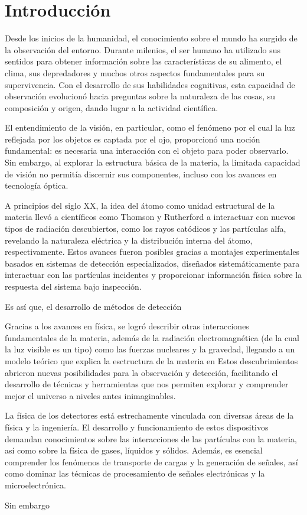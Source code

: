 \documentclass[]{book}
\begin{document}
\chapter{Introducción}

Desde los inicios de la humanidad, el conocimiento sobre el mundo ha surgido de la observación del entorno. Durante milenios, el ser humano ha utilizado sus sentidos para obtener información sobre las características de su alimento, el clima, sus depredadores y muchos otros aspectos fundamentales para su supervivencia. Con el desarrollo de sus habilidades cognitivas, esta capacidad de observación evolucionó hacia preguntas sobre la naturaleza de las cosas, su composición y origen, dando lugar a la actividad científica.

\noindent El entendimiento de la visión, en particular, como el fenómeno por el cual la luz reflejada por los objetos es captada por el ojo, proporcionó una noción fundamental: es necesaria una interacción con el objeto para poder observarlo. Sin embargo, al explorar la estructura básica de la materia, la limitada capacidad de visión no permitía discernir sus componentes, incluso con los avances en tecnología óptica.

A principios del siglo XX, la idea del átomo como unidad estructural de la materia llevó a científicos como Thomson y Rutherford a interactuar con nuevos tipos de radiación descubiertos, como los rayos catódicos y las partículas alfa, revelando la naturaleza eléctrica y la distribución interna del átomo, respectivamente. Estos avances fueron posibles gracias a montajes experimentales basados en sistemas de detección especializados, diseñados sistemáticamente para interactuar con las partículas incidentes y proporcionar información física sobre la respuesta del sistema bajo inspección.

Es así que, el desarrollo de métodos de detección

Gracias a los avances en física, se logró describir otras interacciones fundamentales de la materia, además 
de la radiación electromagnética (de la cual la luz visible es un tipo) como las fuerzas nucleares y la gravedad, llegando a un modelo teórico que explica la esctructura de la materia en  
Estos descubrimientos abrieron nuevas posibilidades para la observación y detección, facilitando el desarrollo de técnicas y herramientas que nos permiten explorar y comprender mejor el universo a niveles antes inimaginables.

La física de los detectores está estrechamente vinculada con diversas áreas de la física y la ingeniería. 
El desarrollo y funcionamiento de estos dispositivos demandan conocimientos sobre las interacciones de las 
partículas con la materia, así como sobre la física de gases, líquidos y sólidos. Además, es esencial comprender 
los fenómenos de transporte de cargas y la generación de señales, así como dominar las técnicas de procesamiento 
de señales electrónicas y la microelectrónica.

Sin embargo
\end{document}
